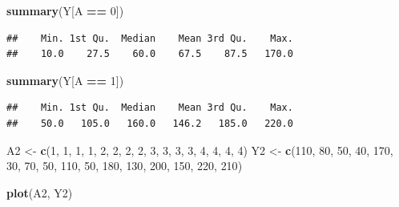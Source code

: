 \documentclass[
  10pt,
]{book}
\newenvironment{Shaded}{\begin{snugshade}}{\end{snugshade}}
\newcommand{\DecValTok}[1]{\textcolor[rgb]{0.00,0.00,0.81}{#1}}
\newcommand{\KeywordTok}[1]{\textcolor[rgb]{0.13,0.29,0.53}{\textbf{#1}}}
\newcommand{\NormalTok}[1]{#1}
\newcommand{\OperatorTok}[1]{\textcolor[rgb]{0.81,0.36,0.00}{\textbf{#1}}}
\newcommand{\StringTok}[1]{\textcolor[rgb]{0.31,0.60,0.02}{#1}}
\begin{document}
\begin{Shaded}
\begin{Highlighting}[]
\KeywordTok{summary}\NormalTok{(Y[A }\OperatorTok{==}\StringTok{ }\DecValTok{0}\NormalTok{])}
\end{Highlighting}
\end{Shaded}

\begin{verbatim}
##    Min. 1st Qu.  Median    Mean 3rd Qu.    Max. 
##    10.0    27.5    60.0    67.5    87.5   170.0
\end{verbatim}

\begin{Shaded}
\begin{Highlighting}[]
\KeywordTok{summary}\NormalTok{(Y[A }\OperatorTok{==}\StringTok{ }\DecValTok{1}\NormalTok{])}
\end{Highlighting}
\end{Shaded}

\begin{verbatim}
##    Min. 1st Qu.  Median    Mean 3rd Qu.    Max. 
##    50.0   105.0   160.0   146.2   185.0   220.0
\end{verbatim}

\begin{Shaded}
\begin{Highlighting}[]
\NormalTok{A2 \textless{}{-}}\StringTok{ }\KeywordTok{c}\NormalTok{(}\DecValTok{1}\NormalTok{, }\DecValTok{1}\NormalTok{, }\DecValTok{1}\NormalTok{, }\DecValTok{1}\NormalTok{, }\DecValTok{2}\NormalTok{, }\DecValTok{2}\NormalTok{, }\DecValTok{2}\NormalTok{, }\DecValTok{2}\NormalTok{, }\DecValTok{3}\NormalTok{, }\DecValTok{3}\NormalTok{, }\DecValTok{3}\NormalTok{, }\DecValTok{3}\NormalTok{, }\DecValTok{4}\NormalTok{, }\DecValTok{4}\NormalTok{, }\DecValTok{4}\NormalTok{, }\DecValTok{4}\NormalTok{)}
\NormalTok{Y2 \textless{}{-}}\StringTok{ }\KeywordTok{c}\NormalTok{(}\DecValTok{110}\NormalTok{, }\DecValTok{80}\NormalTok{, }\DecValTok{50}\NormalTok{, }\DecValTok{40}\NormalTok{, }\DecValTok{170}\NormalTok{, }\DecValTok{30}\NormalTok{, }\DecValTok{70}\NormalTok{, }\DecValTok{50}\NormalTok{, }\DecValTok{110}\NormalTok{, }\DecValTok{50}\NormalTok{, }\DecValTok{180}\NormalTok{,}
        \DecValTok{130}\NormalTok{, }\DecValTok{200}\NormalTok{, }\DecValTok{150}\NormalTok{, }\DecValTok{220}\NormalTok{, }\DecValTok{210}\NormalTok{)}

\KeywordTok{plot}\NormalTok{(A2, Y2)}
\end{Highlighting}
\end{Shaded}
\end{document}
